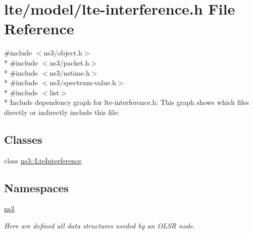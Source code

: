 \hypertarget{lte-interference_8h}{}\section{lte/model/lte-\/interference.h File Reference}
\label{lte-interference_8h}
{\ttfamily \#include $<$ns3/object.\+h$>$}\\*
{\ttfamily \#include $<$ns3/packet.\+h$>$}\\*
{\ttfamily \#include $<$ns3/nstime.\+h$>$}\\*
{\ttfamily \#include $<$ns3/spectrum-\/value.\+h$>$}\\*
{\ttfamily \#include $<$list$>$}\\*
Include dependency graph for lte-\/interference.h\+:
This graph shows which files directly or indirectly include this file\+:
\subsection*{Classes}
\begin{DoxyCompactItemize}
\item 
class \hyperlink{classns3_1_1LteInterference}{ns3\+::\+Lte\+Interference}
\end{DoxyCompactItemize}
\subsection*{Namespaces}
\begin{DoxyCompactItemize}
\item 
 \hyperlink{namespacens3}{ns3}
\begin{DoxyCompactList}\small\item\em Here are defined all data structures needed by an O\+L\+SR node. \end{DoxyCompactList}\end{DoxyCompactItemize}
